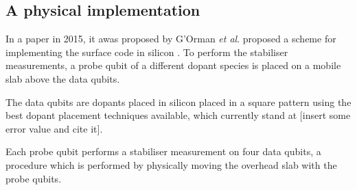 \subsection{A physical implementation} \label{sec:PhysicalImplementation}
In a paper in 2015, it awas proposed by G'Orman \textit{et al}. proposed a scheme for implementing the surface code in silicon \cite{the paper}.  To perform the stabiliser measurements, a probe qubit of a different dopant species is placed on a mobile slab above the data qubits. 


The data qubits are dopants placed in silicon placed in a square pattern using the best dopant placement techniques available, which currently stand at [insert some error value and cite it].

Each probe qubit performs a stabiliser measurement on four data qubits, a procedure which is performed by physically moving the overhead slab with the probe qubits. 



\begin{figure}[H]
	\centering
	\\
	\caption[oddeven]{}
	\label{FIG:paper}
\end{figure}


